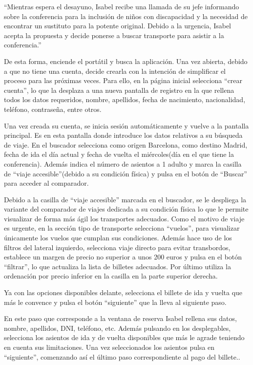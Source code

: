 ``Mientras espera el desayuno, Isabel recibe una llamada de su jefe informando sobre la conferencia para la inclusión de niños con discapacidad y la necesidad de encontrar un sustituto para la potente original. Debido a la urgencia, Isabel acepta la propuesta y decide ponerse a buscar transporte para asistir a la conferencia.''

De esta forma, enciende el portátil y busca la aplicación. Una vez abierta, debido a que no tiene una cuenta, decide crearla con la intención de simplificar el proceso para las próximas veces. Para ello, en la página inicial selecciona ``crear cuenta'', lo que la desplaza a una nueva pantalla de registro en la que rellena todos los datos requeridos, nombre, apellidos, fecha de nacimiento, nacionalidad, teléfono, contraseña, entre otros.

Una vez creada su cuenta, se inicia sesión automáticamente y vuelve a la pantalla principal.
Es en esta pantalla donde introduce los datos relativos a su búsqueda de viaje. En el buscador selecciona como origen Barcelona, como destino Madrid, fecha de ida el día actual y fecha de vuelta el miércoles(día en el que tiene la conferencia). Además indica el número de asientos a 1 adulto y marca la casilla de ``viaje accesible''(debido a su condición física) y pulsa en el botón de ``Buscar'' para acceder al comparador.  

Debido a la casilla de ``viaje accesible'' marcada en el buscador, se le despliega la variante del comparador de viajes dedicada a su condición física lo que le permite visualizar de forma más ágil los transportes adecuados. Como el motivo de viaje es urgente, en la sección tipo de transporte selecciona ``vuelos'', para visualizar únicamente los vuelos que cumplan sus condiciones. Además hace uso de los filtros del lateral izquierdo, selecciona viaje directo para evitar transbordos, establece un margen de precio no superior a unos 200 euros y pulsa en el botón ``filtrar'', lo que actualiza la lista de billetes adecuados. Por último utiliza la ordenación por precio inferior en la casilla en la parte superior derecha.

Ya con las opciones disponibles delante, selecciona el billete de ida y vuelta que más le convence y pulsa el botón ``siguiente'' que la lleva al siguiente paso.

En este paso que corresponde a la ventana de reserva Isabel rellena sus datos, nombre, apellidos, DNI, teléfono, etc. Además pulsando en los desplegables, selecciona los asientos de ida y de vuelta disponibles que más le agrade teniendo en cuenta sus limitaciones. Una vez seleccionados los asientos pulsa en ``siguiente'', comenzando así el último paso correspondiente al pago del billete..


